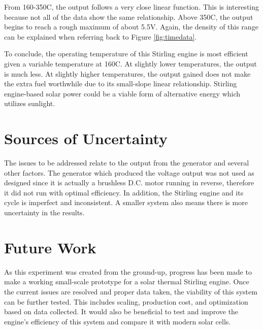 From 160-350\degree C, the output follows a very close linear function. This is interesting because not all of the data show the same relationship. Above 350\degree C, the output begins to reach a rough maximum of about 5.5V. Again, the density of this range can be explained when referring back to Figure \ref{fig:timedata}.

To conclude, the operating temperature of this Stirling engine is most efficient given a variable temperature at 160\degree C. At slightly lower temperatures, the output is much less. At slightly higher temperatures, the output gained does not make the extra fuel worthwhile due to its small-slope linear relationship. Stirling engine-based solar power could be a viable form of alternative energy which utilizes sunlight.

\section{Sources of Uncertainty}
    
    The issues to be addressed relate to the output from the generator and several other factors. The generator which produced the voltage output was not used as designed since it is actually a brushless D.C. motor running in reverse, therefore it did not run with optimal efficiency. In addition, the Stirling engine and its cycle is imperfect and inconsistent. A smaller system also means there is more uncertainty in the results.

\section{Future Work}

    As this experiment was created from the ground-up, progress has been made to make a working small-scale prototype for a solar thermal Stirling engine. Once the current issues are resolved and proper data taken, the viability of this system can be further tested. This includes scaling, production cost, and optimization based on data collected. It would also be beneficial to test and improve the engine's efficiency of this system and compare it with modern solar cells.